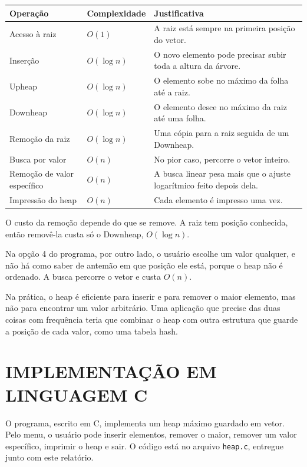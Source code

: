 \documentclass[12pt,openany,oneside,a4paper,english,brazil,sumario=tradicional]{abntex2}
\begin{document}
\begin{quadro}[htb]
\caption{\label{qua:complexidade}Complexidade das operações do heap}
\centering
\small
\begin{tabular}{|p{4.2cm}|>{\centering\arraybackslash}p{2.6cm}|p{7cm}|}
\hline
\textbf{Operação} & \textbf{Complexidade} & \textbf{Justificativa} \\ \hline
Acesso à raiz & $O(1)$ & A raiz está sempre na primeira posição do vetor. \\ \hline
Inserção & $O(\log n)$ & O novo elemento pode precisar subir toda a altura da árvore. \\ \hline
Upheap & $O(\log n)$ & O elemento sobe no máximo da folha até a raiz. \\ \hline
Downheap & $O(\log n)$ & O elemento desce no máximo da raiz até uma folha. \\ \hline
Remoção da raiz & $O(\log n)$ & Uma cópia para a raiz seguida de um Downheap. \\ \hline
Busca por valor & $O(n)$ & No pior caso, percorre o vetor inteiro. \\ \hline
Remoção de valor específico & $O(n)$ & A busca linear pesa mais que o ajuste logarítmico feito depois dela. \\ \hline
Impressão do heap & $O(n)$ & Cada elemento é impresso uma vez. \\ \hline
\end{tabular}
\end{quadro}

O custo da remoção depende do que se remove. A raiz tem posição conhecida, então removê-la custa só o Downheap, $O(\log n)$.

Na opção 4 do programa, por outro lado, o usuário escolhe um valor qualquer, e não há como saber de antemão em que posição ele está, porque o heap não é ordenado. A busca percorre o vetor e custa $O(n)$.

Na prática, o heap é eficiente para inserir e para remover o maior elemento, mas não para encontrar um valor arbitrário. Uma aplicação que precise das duas coisas com frequência teria que combinar o heap com outra estrutura que guarde a posição de cada valor, como uma tabela hash.

\chapter{IMPLEMENTAÇÃO EM LINGUAGEM C}

O programa, escrito em C, implementa um heap máximo guardado em vetor. Pelo menu, o usuário pode inserir elementos, remover o maior, remover um valor específico, imprimir o heap e sair. O código está no arquivo \texttt{heap.c}, entregue junto com este relatório.
\end{document}
